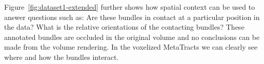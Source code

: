 Figure~\ref{fig:dataset1-extended} further shows how spatial context can be used to answer questions such as:  Are these bundles in contact at a particular position in the data? What is the relative orientations of the contacting bundles? These annotated bundles are occluded in the original volume and no conclusions can be made from the volume rendering. In the voxelized MetaTracts we can clearly see where and how the bundles interact.

